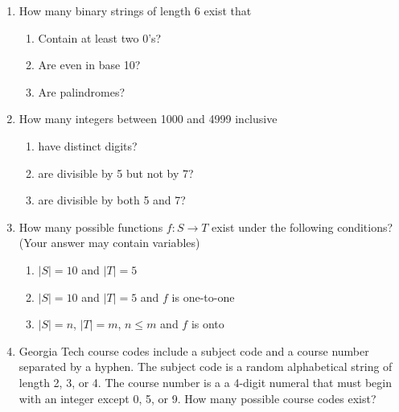 \begin{enumerate}

















    

\item How many binary strings of length 6 exist that 
\begin{enumerate}
    \item Contain at least two 0's?
    \item Are even in base 10?
    \item Are palindromes?
\end{enumerate}

\item How many integers between 1000 and 4999 inclusive 
\begin{enumerate}
    \item have distinct digits?
    \item are divisible by 5 but not by 7?
    \item are divisible by both 5 and 7?
\end{enumerate}

\item How many possible functions $f:S \rightarrow T$ exist under the following conditions? (Your answer may contain variables) 
\begin{enumerate}
    \item $|S|=10$ and $|T|=5$
    \item $|S|=10$ and $|T|=5$ and $f$ is one-to-one
    \item $|S|=n$, $|T|=m$, $n \leq m$ and $f$ is onto 
\end{enumerate}

\item Georgia Tech course codes include a subject code and a course number separated by a hyphen. The subject code is a random alphabetical string of length 2, 3, or 4. The course number is a a 4-digit numeral that must begin with an integer except 0, 5, or 9. How many possible course codes exist? 


\end{enumerate}
